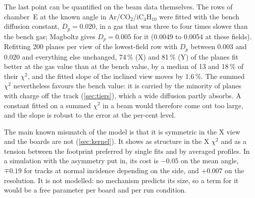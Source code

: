 The last point can be quantified on the beam data themselves. The rows of chamber~E at the known angle in
Ar/CO$_2$/iC$_4$H$_{10}$ were fitted with the bench diffusion constant, $D_p = 0.020$, in a gas that was three to four
times slower than the bench gas; Magboltz gives $D_p = 0.005$ for it (0.0049 to 0.0054 at these fields). Refitting 200 planes per view of the lowest-field row with $D_p$ between 0.003 and 0.020 and everything else unchanged,
74\,\% (X) and 81\,\% (Y) of the planes fit better at the gas value than at the bench value, by a median of 13 and
18\,\% of their $\chi^2$, and the fitted slope of the inclined view moves by 1.6\,\%. The summed $\chi^2$ nevertheless
favours the bench value: it is carried by the minority of planes with charge off the track (\cref{sec:tiers}), which a
wide diffusion partly absorbs. A constant fitted on a summed $\chi^2$ in a beam would therefore come out too large,
and the slope is robust to the error at the per-cent level.

The main known mismatch of the model is that it is symmetric in the X view and the boards are
not (\cref{sec:kernel}). It shows as structure in the X $\chi^2$ and as a tension between the footprint preferred by
single fits and by averaged profiles. In a simulation with the asymmetry put in, its cost is $-0.05$\textdegree{}
on the mean angle, $\mp0.19$\textdegree{} for tracks at normal incidence depending on the side, and
$+0.007$\textdegree{} on the resolution. It is not modelled: no mechanism predicts its size, so a term for it would be
a free parameter per board and per run condition.
